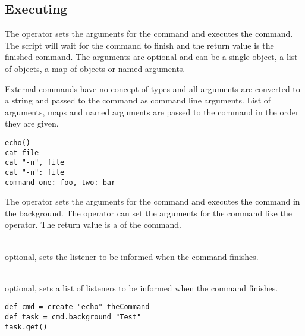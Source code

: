 \subsection{Executing} 

%

The  operator sets the arguments for the command and executes 
the command. The script will wait for the command to finish and the return 
value 
is the finished command. The arguments are optional and can be a single object, 
a list of objects, a map of objects or named arguments. 

External commands have no concept of 
types and all arguments are converted
to a string and passed to the command as command line arguments.
List of arguments, maps and named arguments are passed to the command
in the order they are given.

\begin{lstlisting}[style=Groovybash, label={lst:example_call_op}, 
title={Execute command with no arguments or with specified arguments either 
direct or by key=value pairs.}]
echo()
cat file
cat "-n", file
cat "-n": file
command one: foo, two: bar
\end{lstlisting}

%

The  operator sets the arguments for the command and 
executes the
command in the background. 
The operator can set the arguments for the command like the 
operator. The return value is a  of the command.

\begin{asparadesc}
%
\item[\code{listener}] \hfill \\
optional, sets the \cite{propertychangelistener13}
listener to be informed when the command finishes.
%
\item[\code{listeners}] \hfill \\
optional, sets a list of \cite{propertychangelistener13}
listeners to be informed when the command finishes.
%
\end{asparadesc}

\begin{lstlisting}[style=Groovybash, label={lst:example_background1}, 
title={Starts the command in the background and waits for the command to finish 
at some later time.}]
def cmd = create "echo" theCommand
def task = cmd.background "Test"
task.get()
\end{lstlisting}

